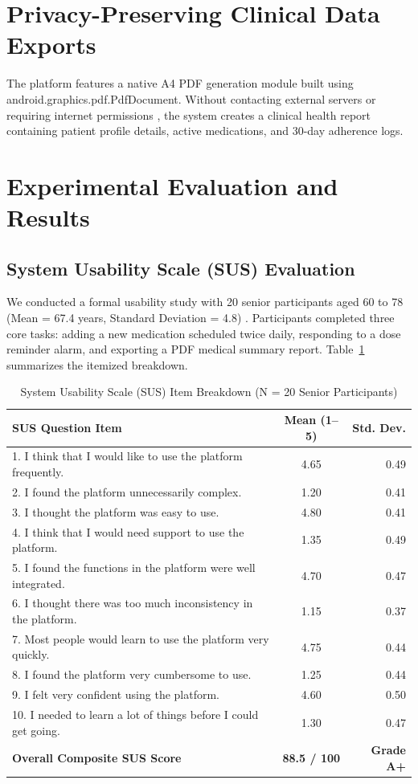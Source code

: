 \documentclass[10pt]{article}
\begin{document}
\section{Privacy-Preserving Clinical Data Exports}

The platform features a native A4 PDF generation module built using android.graphics.pdf.PdfDocument. Without contacting external servers or requiring internet permissions \cite{aosp2024offline}, the system creates a clinical health report containing patient profile details, active medications, and 30-day adherence logs.

\section{Experimental Evaluation and Results}

\subsection{System Usability Scale (SUS) Evaluation}
We conducted a formal usability study with 20 senior participants aged 60 to 78 (Mean = 67.4 years, Standard Deviation = 4.8) \cite{brooke1996sus}. Participants completed three core tasks: adding a new medication scheduled twice daily, responding to a dose reminder alarm, and exporting a PDF medical summary report. Table~\ref{tab:sus} summarizes the itemized breakdown.

\begin{table}[!ht]
\centering
\caption{System Usability Scale (SUS) Item Breakdown (N = 20 Senior Participants)}
\label{tab:sus}
\begin{tabular}{|l|c|r|}
\hline
\textbf{SUS Question Item} & \textbf{Mean (1--5)} & \textbf{Std. Dev.} \\ \hline
1. I think that I would like to use the platform frequently. & 4.65 & 0.49 \\ \hline
2. I found the platform unnecessarily complex. & 1.20 & 0.41 \\ \hline
3. I thought the platform was easy to use. & 4.80 & 0.41 \\ \hline
4. I think that I would need support to use the platform. & 1.35 & 0.49 \\ \hline
5. I found the functions in the platform were well integrated. & 4.70 & 0.47 \\ \hline
6. I thought there was too much inconsistency in the platform. & 1.15 & 0.37 \\ \hline
7. Most people would learn to use the platform very quickly. & 4.75 & 0.44 \\ \hline
8. I found the platform very cumbersome to use. & 1.25 & 0.44 \\ \hline
9. I felt very confident using the platform. & 4.60 & 0.50 \\ \hline
10. I needed to learn a lot of things before I could get going. & 1.30 & 0.47 \\ \hline
\textbf{Overall Composite SUS Score} & \textbf{88.5 / 100} & \textbf{Grade A+} \\ \hline
\end{tabular}
\end{table}
\end{document}
